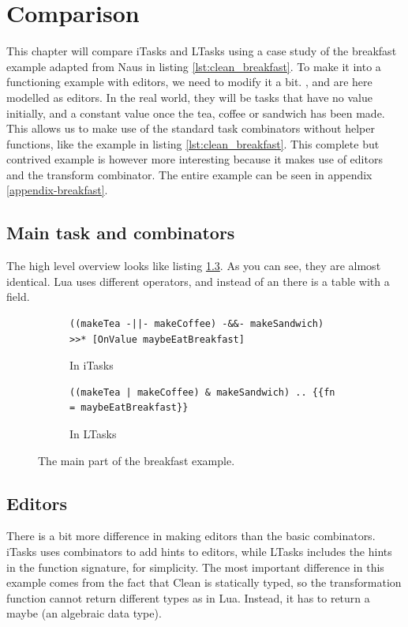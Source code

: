 \chapter{Comparison}\label{comparison}
This chapter will compare iTasks and LTasks using a case study of the breakfast example adapted from Naus \cite{naus2020assisting} in listing \ref{lst:clean_breakfast}. To make it into a functioning example with editors, we need to modify it a bit. ,  and  are here modelled as editors. In the real world, they will be tasks that have no value initially, and a constant value once the tea, coffee or sandwich has been made. This allows us to make use of the standard task combinators without helper functions, like the example in listing \ref{lst:clean_breakfast}. This complete but contrived example is however more interesting because it makes use of editors and the transform combinator. The entire example can be seen in appendix \ref{appendix-breakfast}.

\section{Main task and combinators}
The high level overview looks like listing \ref{lst:comparison_breakfast}. As you can see, they are almost identical. Lua uses different operators, and instead of an  there is a table with a  field.

\begin{figure}[ht]
\begin{subfigure}{\textwidth}
\centering
\begin{verbatim}
((makeTea -||- makeCoffee) -&&- makeSandwich) >>* [OnValue maybeEatBreakfast]
\end{verbatim}
\caption{In iTasks}
\label{lst:comparison_breakfast_clean}
\end{subfigure}
\begin{subfigure}{\textwidth}
\centering
\bigskip %
\begin{verbatim}
((makeTea | makeCoffee) & makeSandwich) .. {{fn = maybeEatBreakfast}}
\end{verbatim}
\caption{In LTasks}
\label{lst:comparison_breakfast_lua}
\end{subfigure}
\caption{The main part of the breakfast example.}
\label{lst:comparison_breakfast}
\end{figure}

\section{Editors}
There is a bit more difference in making editors than the basic combinators. iTasks uses combinators to add hints to editors, while LTasks includes the hints in the function signature, for simplicity. The most important difference in this example comes from the fact that Clean is statically typed, so the transformation function cannot return different types as in Lua. Instead, it has to return a maybe (an algebraic data type).

